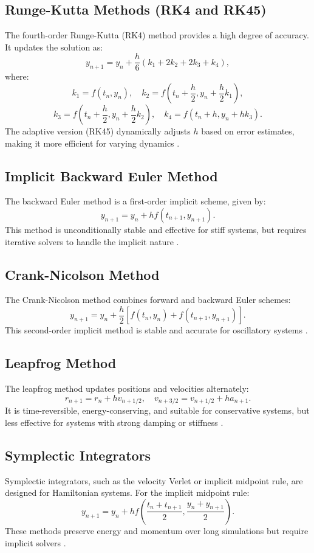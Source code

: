 \documentclass[12pt]{article}
\begin{document}
\subsection{Runge-Kutta Methods (RK4 and RK45)}
The fourth-order Runge-Kutta (RK4) method provides a high degree of accuracy. It updates the solution as:
\[
y_{n+1} = y_n + \frac{h}{6}(k_1 + 2k_2 + 2k_3 + k_4),
\]
where:
\[
k_1 = f(t_n, y_n), \quad
k_2 = f\left(t_n + \frac{h}{2}, y_n + \frac{h}{2}k_1\right),
\]
\[
k_3 = f\left(t_n + \frac{h}{2}, y_n + \frac{h}{2}k_2\right), \quad
k_4 = f(t_n + h, y_n + hk_3).
\]
The adaptive version (RK45) dynamically adjusts \( h \) based on error estimates, making it more efficient for varying dynamics \cite{press2007numerical}.

\subsection{Implicit Backward Euler Method}
The backward Euler method is a first-order implicit scheme, given by:
\[
y_{n+1} = y_n + h f(t_{n+1}, y_{n+1}).
\]
This method is unconditionally stable and effective for stiff systems, but requires iterative solvers to handle the implicit nature \cite{ascher1998computer}.

\subsection{Crank-Nicolson Method}
The Crank-Nicolson method combines forward and backward Euler schemes:
\[
y_{n+1} = y_n + \frac{h}{2}\left[f(t_n, y_n) + f(t_{n+1}, y_{n+1})\right].
\]
This second-order implicit method is stable and accurate for oscillatory systems \cite{hairer1993solving}.

\subsection{Leapfrog Method}
The leapfrog method updates positions and velocities alternately:
\[
r_{n+1} = r_n + h v_{n+1/2}, \quad
v_{n+3/2} = v_{n+1/2} + h a_{n+1}.
\]
It is time-reversible, energy-conserving, and suitable for conservative systems, but less effective for systems with strong damping or stiffness \cite{landau2015survey}.

\subsection{Symplectic Integrators}
Symplectic integrators, such as the velocity Verlet or implicit midpoint rule, are designed for Hamiltonian systems. For the implicit midpoint rule:
\[
y_{n+1} = y_n + h f\left(\frac{t_n + t_{n+1}}{2}, \frac{y_n + y_{n+1}}{2}\right).
\]
These methods preserve energy and momentum over long simulations but require implicit solvers \cite{hairer1993solving}.
\end{document}
